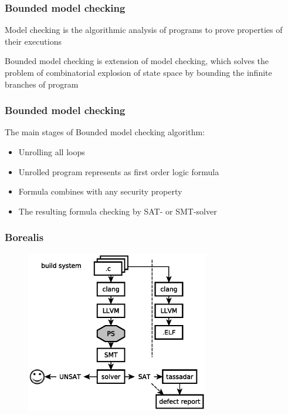 \begin{frame}
	\frametitle{Bounded model checking}
	
	\begin{block}{}
	\centering
	Model checking is the algorithmic analysis of programs to prove properties
of their executions
	\end{block}
		
	\begin{block}{}
	\centering
	Bounded model checking is extension of model checking, which solves the problem of combinatorial explosion of state space by bounding the infinite branches of program
	\end{block}
		
\end{frame}


\begin{frame}
\frametitle{Bounded model checking}
The main stages of Bounded model checking algorithm:
	\begin{itemize}
		\item Unrolling all loops
		\item Unrolled program represents as first order logic formula
		\item Formula combines with any security property
		\item The resulting formula checking by SAT- or SMT-solver
	\end{itemize}
\end{frame}



\begin{frame}
	\frametitle{Borealis}
	
	\begin{figure}
	\includegraphics[width=80mm]{image/BorealisOverview}
	\end{figure}	
	
\end{frame}

